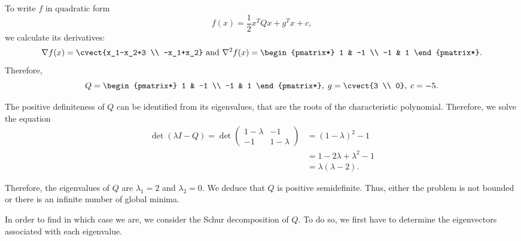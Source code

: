 
To write $f$ in quadratic form
\[
f(x) = \frac{1}{2} x^T Q x + g^T x + c,
\]
we calculate its derivatives:
\[
\nabla f(x) = \cvect{x_1-x_2+3 \\ -x_1+x_2} \text{ and } \nabla^2 f(x)
= \begin{pmatrix*}
  1 & -1 \\ -1 & 1
\end{pmatrix*}.
\]
Therefore,
\[
Q=\begin{pmatrix*}
  1 & -1 \\ -1 & 1
\end{pmatrix*}, \; g=\cvect{3 \\ 0}, \; c= -5.
\]


The positive definiteness of $Q$ can be identified from its
eigenvalues, that are the roots of the characteristic
polynomial. Therefore, we solve the equation
\begin{align*}
\det(\lambda I - Q) = \det \begin{pmatrix}
1- \lambda & -1\\ -1 & 1-\lambda
\end{pmatrix} & = (1-\lambda)^2 - 1\\
& = 1-2\lambda+\lambda^2 -1 \\
&= \lambda(\lambda-2).
\end{align*}

Therefore, the eigenvalues of $Q$ are $\lambda_1=2$ and $\lambda_2=0$. We deduce that $Q$ is positive semidefinite. Thus, either the problem is not bounded or there is an infinite number of global minima.

In order to find in which case we are, we consider the Schur decomposition of $Q$. To do so, we first have to determine the eigenvectors associated with each eigenvalue.

